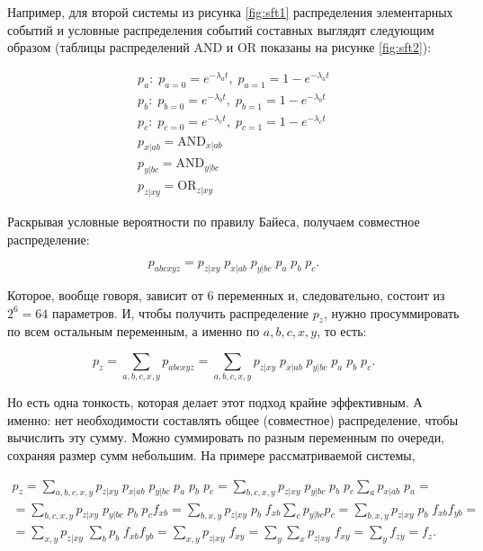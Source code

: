 \documentclass[a4paper, 12pt]{article}
\begin{document}
Например, для второй системы из рисунка \ref{fig:sft1} распределения элементарных событий и условные распределения событий составных выглядят следующим образом (таблицы распределений AND и OR показаны на рисунке \ref{fig:sft2}):

\begin{equation*}
  \begin{array}{l}
    p_a: \; p_{a=0} = e^{-\lambda_a t},\; p_{a=1} = 1 - e^{-\lambda_a t} \\
    p_b: \; p_{b=0} = e^{-\lambda_b t},\; p_{b=1} = 1 - e^{-\lambda_b t} \\
    p_c: \; p_{c=0} = e^{-\lambda_c t},\; p_{c=1} = 1 - e^{-\lambda_c t} \\
    p_{x|ab} = \textrm{AND}_{x|ab} \\
    p_{y|bc} = \textrm{AND}_{y|bc} \\
    p_{z|xy} = \textrm{OR}_{z|xy}
  \end{array}
\end{equation*}

Раскрывая условные вероятности по правилу Байеса, получаем совместное распределение:

\begin{equation*}
  p_{abcxyz} = p_{z|xy} \; p_{x|ab} \; p_{y|bc} \; p_a \; p_b \; p_c.
\end{equation*}

Которое, вообще говоря, зависит от $6$ переменных и, следовательно, состоит из $2^6 = 64$ параметров. И, чтобы получить распределение $p_z$, нужно просуммировать по всем остальным переменным, а именно по $a, b, c, x, y$, то есть:

\begin{equation*}
  p_z = \sum\limits_{a,b,c,x,y} p_{abcxyz}
  = \sum\limits_{a,b,c,x,y} p_{z|xy} \; p_{x|ab} \; p_{y|bc} \; p_a \; p_b \; p_c.
\end{equation*}

Но есть одна тонкость, которая делает этот подход крайне эффективным. А именно: нет необходимости составлять общее (совместное) распределение, чтобы вычислить эту сумму. Можно суммировать по разным переменным по очереди, сохраняя размер сумм небольшим. На примере рассматриваемой системы,

\begin{gather*}
    p_z = \sum\limits_{a,b,c,x,y} p_{z|xy} \; p_{x|ab} \; p_{y|bc} \; p_a \; p_b \; p_c
    = \sum\limits_{b,c,x,y} p_{z|xy} \; p_{y|bc} \; p_b \; p_c \sum\limits_{a} p_{x|ab} \; p_a
    = \\
    = \sum\limits_{b,c,x,y} p_{z|xy} \; p_{y|bc} \; p_b \; p_c f_{xb} 
    = \sum\limits_{b,x,y} p_{z|xy} \; p_b \; f_{xb} \sum\limits_c p_{y|bc} p_c
    = \sum\limits_{b,x,y} p_{z|xy} \; p_b \; f_{xb} f_{yb}
    = \\
    = \sum\limits_{x,y} p_{z|xy} \; \sum\limits_b p_b \; f_{xb} f_{yb}
    = \sum\limits_{x,y} p_{z|xy} \; f_{xy}
    = \sum\limits_y \sum\limits_x p_{z|xy} \; f_{xy}
    = \sum\limits_y f_{zy} = f_z.
\end{gather*}
\end{document}
